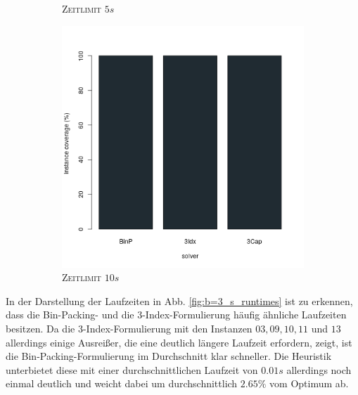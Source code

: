 \begin{figure}[H]
\begin{subfigure}[b]{0.3\textwidth}
\caption{\textsc{Zeitlimit} $5s$}
\label{fig:instance_coverage_b=3_s_b}
\end{subfigure}
\hfill
\begin{subfigure}[b]{0.3\textwidth}
\centering
\includegraphics[width=1.2\textwidth]{img/solver_instance_coverage_b=3_s_10s.png}
\caption{\textsc{Zeitlimit} $10s$}
\label{fig:instance_coverage_b=3_s_c}
\end{subfigure}

\caption{}
\label{fig:instance_coverage_b=3_s}
\end{figure}

In der Darstellung der Laufzeiten in Abb. \ref{fig:b=3_s_runtimes} ist zu erkennen, dass die Bin-Packing-
und die 3-Index-Formulierung häufig ähnliche Laufzeiten besitzen. Da die 3-Index-Formulierung mit den Instanzen
$03, 09, 10, 11$ und $13$ allerdings einige Ausreißer, die eine deutlich längere Laufzeit erfordern, zeigt,
ist die Bin-Packing-Formulierung im Durchschnitt klar schneller.
Die Heuristik unterbietet diese mit einer durchschnittlichen Laufzeit von $0.01s$ allerdings noch einmal deutlich
und weicht dabei um durchschnittlich $2.65 \%$ vom Optimum ab.

